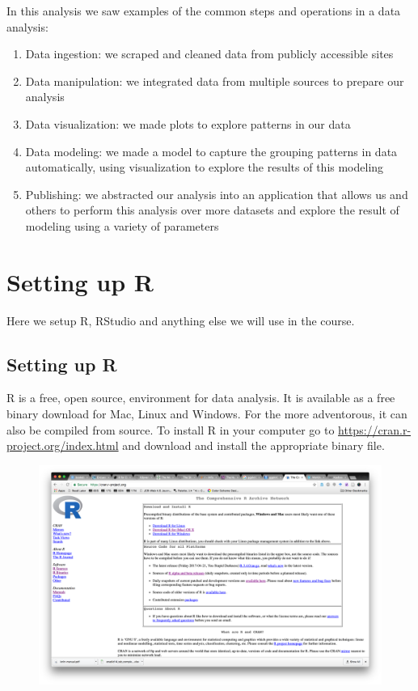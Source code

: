 \documentclass[]{article}
\theoremstyle{definition}
\theoremstyle{definition}
\theoremstyle{remark}
\begin{document}
In this analysis we saw examples of the common steps and operations in a
data analysis:

\begin{enumerate}
\def\labelenumi{\arabic{enumi})}
\item
  Data ingestion: we scraped and cleaned data from publicly accessible
  sites
\item
  Data manipulation: we integrated data from multiple sources to prepare
  our analysis
\item
  Data visualization: we made plots to explore patterns in our data
\item
  Data modeling: we made a model to capture the grouping patterns in
  data automatically, using visualization to explore the results of this
  modeling
\item
  Publishing: we abstracted our analysis into an application that allows
  us and others to perform this analysis over more datasets and explore
  the result of modeling using a variety of parameters
\end{enumerate}

\section{Setting up R}\label{setting-up-r}

Here we setup R, RStudio and anything else we will use in the course.

\subsection{Setting up R}\label{setting-up-r-1}

R is a free, open source, environment for data analysis. It is available
as a free binary download for Mac, Linux and Windows. For the more
adventorous, it can also be compiled from source. To install R in your
computer go to \url{https://cran.r-project.org/index.html} and download
and install the appropriate binary file.

\begin{figure}[htbp]
\centering
\includegraphics{img/cran.png}
\caption{}
\end{figure}
\end{document}
